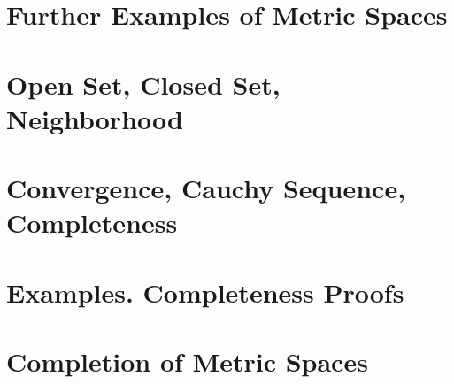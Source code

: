 \section{Further Examples of Metric Spaces}

\section{Open Set, Closed Set, Neighborhood}

\section{Convergence, Cauchy Sequence, Completeness}

\section{Examples. Completeness Proofs}

\section{Completion of Metric Spaces}
